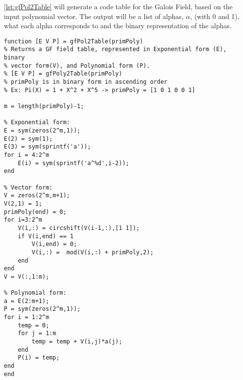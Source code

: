 \documentclass[Main]{subfiles}
\begin{document}
\codeTitle \ref{lst:gfPol2Table} will generate a code table for the Galois Field, based on the input polynomial vector.
The output will be a list of alphas, $\alpha$, (with 0 and 1), what each alpha corresponds to and the binary representation of the alphas.
\begin{lstlisting}[caption=gfPol2Table, style=Code-Matlab, label=lst:1]
function [E V P] = gfPol2Table(primPoly)
% Returns a GF field table, represented in Exponential form (E), binary
% vector form(V), and Polynomial form (P).
% [E V P] = gfPoly2Table(primPoly)
% primPoly is in binary form in ascending order
% Ex: Pi(X) = 1 + X^2 + X^5 -> primPoly = [1 0 1 0 0 1]

m = length(primPoly)-1;

% Exponential form:
E = sym(zeros(2^m,1));
E(2) = sym(1);
E(3) = sym(sprintf('a'));
for i = 4:2^m
    E(i) = sym(sprintf('a^%d',i-2));
end

% Vector form:
V = zeros(2^m,m+1);
V(2,1) = 1;
primPoly(end) = 0;
for i=3:2^m
    V(i,:) = circshift(V(i-1,:),[1 1]);
    if V(i,end) == 1
        V(i,end) = 0;
        V(i,:) =  mod(V(i,:) + primPoly,2);
    end
end
V = V(:,1:m);

% Polynomial form:
a = E(2:m+1);
P = sym(zeros(2^m,1));
for i = 1:2^m
    temp = 0;
    for j = 1:m
        temp = temp + V(i,j)*a(j);
    end
    P(i) = temp;
end
end
\end{lstlisting}
\end{document}

